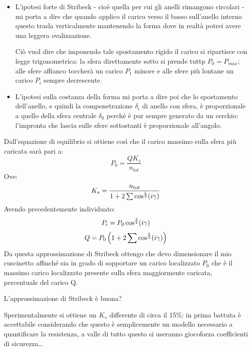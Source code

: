 \documentclass[a4paper, 15pt]{article}
\begin{document}
			\begin{itemize}
				\item L’ipotesi forte di Stribeck - cioè quella per cui gli anelli rimangono circolari - mi porta a dire che quando applico il carico verso il basso sull’anello interno questo trasla verticalmente mantenendo la forma dove in realtà potrei avere una leggera ovalizzazione.\newline 
				
				Ciò vuol dire che imponendo tale spostamento rigido il carico si ripartisce con legge trigonometrica: la sfera direttamente sotto si prende tuttp $P_0 = P_{max}$; alle sfere affianco toccherà un carico $P_1$ minore e alle sfere più lontane un carico $P_i$ sempre decrescente.
				
				\item L’ipotesi sulla costanza della forma mi porta a dire poi che lo spostamento dell’anello, e quindi la compenetrazione $\delta_i$ di anello con sfera, è proporzionale a quello della sfera centrale $\delta_0$ perché è pur sempre generato da un cerchio: l’impronta che lascia sulle sfere sottostanti è proporzionale all’angolo.
			\end{itemize}
\newpage			
			Dall'equazione di equilibrio si ottiene così che il carico massimo sulla sfera più caricata sarà pari a:
			\[P_0 = \dfrac{QK_s}{n_{tot}}\]
			Ove:
			\[K_s = \dfrac{n_{tot}}{1+2\sum\cos^{5\over2}(i\gamma)}\]
			Avendo precedentemente individuato: 
			\[P_i = P_0\cos^{3\over2}(i\gamma)\]
			\[Q = P_0\left(1+2\sum\cos^{5\over2}(i\gamma)\right)\]
			Da questa approssimazione di Stribeck ottengo che devo dimensionare il mio cuscinetto affinché sia in grado di sopportare un carico localizzato $P_0$ che è il massimo carico localizzato presente sulla sfera maggiormente caricata, percentuale del carico Q. \newline 
			
			L’approssimazione di Stribeck è buona?
			
			Sperimentalmente si ottiene un $K_s$ differente di circa il 15\%: in prima battuta è accettabile considerando che questo è semplicemente un modello necessario a quantificare la resistenza, a valle di tutto questo si useranno giocoforza coefficienti di sicurezza\dots	
			
\end{document}
